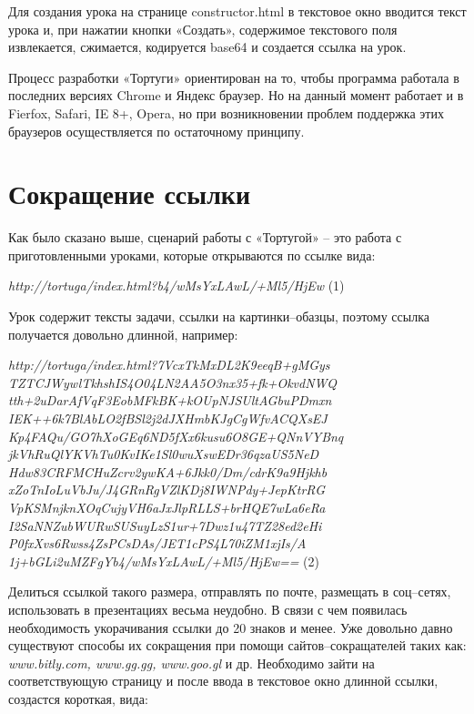 Для создания урока на странице constructor.html в текстовое окно вводится текст урока и, при нажатии кнопки «Создать», содержимое текстового поля извлекается, сжимается, кодируется base64 и создается ссылка на урок.\par
Процесс разработки «Тортуги» ориентирован на то, чтобы программа работала в последних версиях Chrome и Яндекс браузер. Но на данный момент работает и в Fierfox, Safari, IE 8+, Opera, но при возникновении проблем поддержка этих браузеров осуществляется по остаточному принципу.\par
\chapter{Сокращение ссылки} \label{chapt1}

Как было сказано выше, сценарий работы с «Тортугой» – это работа с приготовленными уроками, которые открываются по ссылке вида: \par
\vspace{6mm}
\begin{center}
 \textit{ http://tortuga/index.html?b4/wMsYxLAwL/+Ml5/HjEw } (1)\par

\end{center}
\vspace{6mm}

Урок содержит тексты задачи, ссылки на картинки–обазцы, поэтому ссылка получается довольно длинной, например: \par

\begin{center}
\vspace{6mm}
 \textit{ http://tortuga/index.html?7VcxTkMxDL2K9eeqB+gMGys
 TZTCJWywlTkhshIS4O04LN2AA5O3nx35+fk+OkvdNWQ
 tth+2uDarAfVqF3EobMFkBK+kOUpNJSUltAGbuPDmxn
 IEK++6k7BlAbLO2fBSl2j2dJXHmbKJgCgWfvACQXsEJ
 Kp4FAQu/GO7hXoGEq6ND5fXx6kusu6O8GE+QNnVYBnq
 jkVhRuQlYKVhTu0KvIKe1Sl0wuXswEDr36qzaUS5NeD
 Hdw83CRFMCHuZcrv2ywKA+6Jkk0/Dm/cdrK9a9Hjkhb
 xZoTnIoLuVbJu/J4GRnRgVZlKDj8IWNPdy+JepKtrRG
 VpKSMnjknXOqCujyVH6aJxJlpRLLS+brHQE7wLa6eRa
 I2SaNNZubWURwSUSuyLzS1ur+7Dwz1u47TZ28ed2eHi
 P0fxXvs6Rwss4ZsPCsDAs/JET1cPS4L70iZM1xjIs/A
 1j+bGLi2uMZFgYb4/wMsYxLAwL/+Ml5/HjEw== } (2)\par
\end{center}

\vspace{6mm}

Делиться ссылкой такого размера, отправлять по почте, размещать в соц–сетях, использовать в презентациях весьма неудобно. В связи с чем появилась необходимость укорачивания ссылки до 20 знаков и менее. Уже довольно давно существуют способы их сокращения при помощи сайтов–сокращателей таких как:  \textit{www.bitly.com, www.gg.gg, www.goo.gl} и др. Необходимо зайти на соответствующую страницу и после ввода в текстовое окно длинной ссылки, создастся короткая, вида:
 
